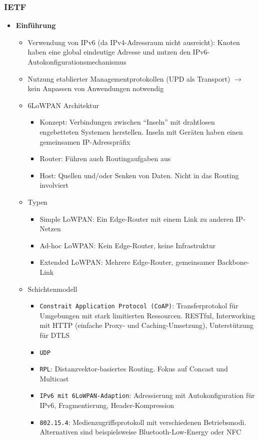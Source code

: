 \subsubsection{IETF}
\begin{itemize}
	\item \textbf{Einführung}
	\begin{itemize}
		\item Verwendung von IPv6 (da IPv4-Adressraum nicht ausreicht): Knoten haben eine global eindeutige Adresse und nutzen den IPv6-Autokonfigurationsmechanismus
		\item Nutzung etablierter Managementprotokollen (UPD als Transport) \(\rightarrow\) kein Anpassen von Anwendungen notwendig
		\item 6LoWPAN Architektur
		\begin{itemize}
			\item Konzept: Verbindungen zwischen "`Inseln"' mit drahtlosen engebetteten Systemen herstellen. Inseln mit Geräten haben einen gemeinsamen IP-Adresspräfix
			\item Router: Führen auch Routingaufgaben aus
			\item Host: Quellen und/oder Senken von Daten. Nicht in das Routing involviert
		\end{itemize}
		\item Typen
		\begin{itemize}
			\item Simple LoWPAN: Ein Edge-Router mit einem Link zu anderen IP-Netzen
			\item Ad-hoc LoWPAN: Kein Edge-Router, keine Infrastruktur
			\item Extended LoWPAN: Mehrere Edge-Router, gemeinsamer Backbone-Link
		\end{itemize}
		\item Schichtenmodell
		\begin{itemize}
			\item \texttt{Constrait Application Protocol (CoAP)}: Transferprotokol für Umgebungen mit stark limitierten Ressourcen. RESTful, Interworking mit HTTP (einfache Proxy- und Caching-Umsetzung), Unterstützung für DTLS
			\item \texttt{UDP}
			\item \texttt{RPL}: Distanzvektor-basiertes Routing. Fokus auf Concast und Multicast
			\item \texttt{IPv6 mit 6LoWPAN-Adaption}: Adressierung mit Autokonfiguration für IPv6, Fragmentierung, Header-Kompression
			\item \texttt{802.15.4}: Medienzugriffsprotokoll mit verschiedenen Betriebsmodi. Alternativen sind beispielsweise Bluetooth-Low-Energy oder NFC

\end{itemize}
\end{itemize}
\end{itemize}
